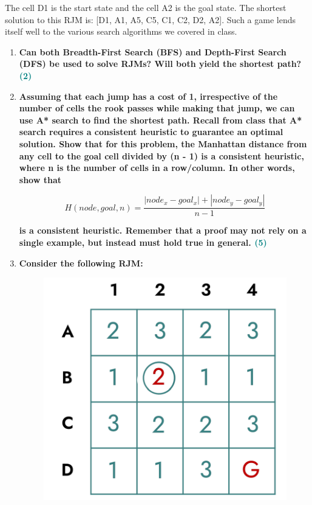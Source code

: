\documentclass[a4paper]{article}
\begin{document}
\begin{sloppypar}
\noindent The cell D1 is the start state and the cell A2 is the goal state. The shortest solution to this
RJM is: [D1, A1, A5, C5, C1, C2, D2, A2]. Such a game lends itself well to the various
search algorithms we covered in class.

\begin{enumerate}[start=6,label=Q\arabic*,left=0pt]
    \item \textbf{Can both Breadth-First Search (BFS) and Depth-First Search (DFS) be used to solve RJMs? Will both yield the shortest path? \hfill \textcolor{teal}{(2)}}
    
    \par

    \item \textbf{Assuming that each jump has a cost of 1, irrespective of the number of cells the rook
    passes while making that jump, we can use A* search to find the shortest path. Recall
    from class that A* search requires a consistent heuristic to guarantee an optimal solution.
    Show that for this problem, the Manhattan distance from any cell to the goal cell divided
    by (n - 1) is a consistent heuristic, where n is the number of cells in a row/column. In other words, show that}

    \[ H(node, goal, n) = \frac{|node_x - goal_x| + |node_y - goal_y|}{n - 1} \]

    \textbf{is a consistent heuristic. Remember that a proof may not rely on a single example, but instead must hold true in general. \hfill \textcolor{teal}{(5)}}
    
    \par
    
    \item \textbf{Consider the following RJM:}
    \begin{figure}[H]
        \centering  
        \includegraphics[height=0.2\textheight]{Q8_RJM.png}
        \label{fig:Q8_RJM}
    \end{figure}


\end{enumerate}
\end{sloppypar}
\end{document}
